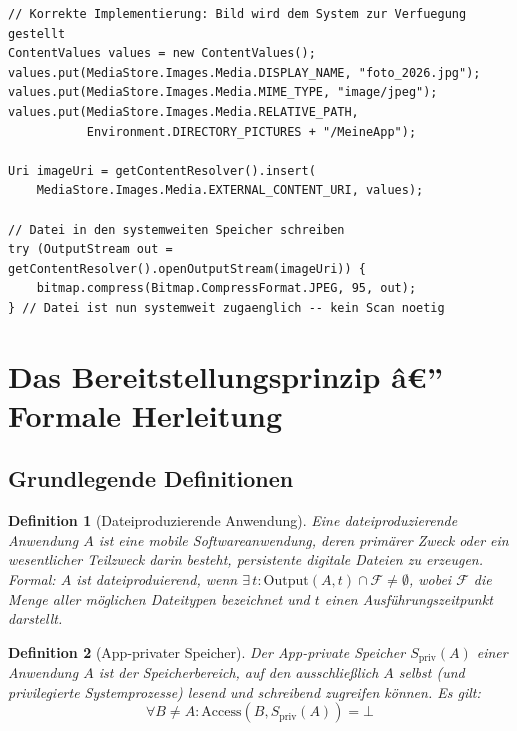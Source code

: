 ﻿\documentclass[12pt, a4paper]{article}
\newtheorem{definition}{Definition}[section]
\begin{document}
\begin{lstlisting}[style=android, caption={Korrekte Uebergabe eines Bildes an den MediaStore unter Android}]
// Korrekte Implementierung: Bild wird dem System zur Verfuegung gestellt
ContentValues values = new ContentValues();
values.put(MediaStore.Images.Media.DISPLAY_NAME, "foto_2026.jpg");
values.put(MediaStore.Images.Media.MIME_TYPE, "image/jpeg");
values.put(MediaStore.Images.Media.RELATIVE_PATH,
           Environment.DIRECTORY_PICTURES + "/MeineApp");

Uri imageUri = getContentResolver().insert(
    MediaStore.Images.Media.EXTERNAL_CONTENT_URI, values);

// Datei in den systemweiten Speicher schreiben
try (OutputStream out = getContentResolver().openOutputStream(imageUri)) {
    bitmap.compress(Bitmap.CompressFormat.JPEG, 95, out);
} // Datei ist nun systemweit zugaenglich -- kein Scan noetig
\end{lstlisting}

\section{Das Bereitstellungsprinzip â€” Formale Herleitung}
\label{sec:prinzip}

\subsection{Grundlegende Definitionen}

\begin{definition}[Dateiproduzierende Anwendung]
\label{def:dpapp}
Eine \emph{dateiproduzierende Anwendung} $A$ ist eine mobile Softwareanwendung, deren
primärer Zweck oder ein wesentlicher Teilzweck darin besteht, persistente digitale
Dateien zu erzeugen. Formal: $A$ ist dateiproduierend, wenn $\exists\, t: \text{Output}(A, t) \cap \mathcal{F} \neq \emptyset$,
wobei $\mathcal{F}$ die Menge aller möglichen Dateitypen bezeichnet und $t$ einen
Ausführungszeitpunkt darstellt.
\end{definition}

\begin{definition}[App-privater Speicher]
\label{def:privatspeicher}
Der \emph{App-private Speicher} $S_{\text{priv}}(A)$ einer Anwendung $A$ ist der
Speicherbereich, auf den ausschließlich $A$ selbst (und privilegierte Systemprozesse)
lesend und schreibend zugreifen können. Es gilt:
\[
  \forall B \neq A: \text{Access}(B, S_{\text{priv}}(A)) = \bot
\]
\end{definition}
\end{document}
